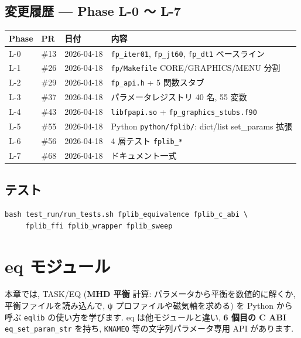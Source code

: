 \documentclass[11pt,a4paper]{report}
\begin{document}
\section{変更履歴 — Phase L-0 〜 L-7}

\begin{center}
\begin{tabular}{@{}lllp{6.5cm}@{}}
\toprule
Phase & PR  & 日付        & 内容 \\ \midrule
L-0   & \#13 & 2026-04-18 & \texttt{fp\_iter01}, \texttt{fp\_jt60}, \texttt{fp\_dt1} ベースライン \\
L-1   & \#26 & 2026-04-18 & \texttt{fp/Makefile} CORE/GRAPHICS/MENU 分割 \\
L-2   & \#29 & 2026-04-18 & \texttt{fp\_api.h} + 5 関数スタブ \\
L-3   & \#37 & 2026-04-18 & パラメータレジストリ 40 名, 55 変数 \\
L-4   & \#43 & 2026-04-18 & \texttt{libfpapi.so} + \texttt{fp\_graphics\_stubs.f90} \\
L-5   & \#55 & 2026-04-18 & Python \texttt{python/fplib/}: dict/list set\_params 拡張 \\
L-6   & \#56 & 2026-04-18 & 4 層テスト \texttt{fplib\_*} \\
L-7   & \#68 & 2026-04-18 & ドキュメント一式 \\
\bottomrule
\end{tabular}
\end{center}

\section{テスト}

\begin{lstlisting}[style=bash]
bash test_run/run_tests.sh fplib_equivalence fplib_c_abi \
     fplib_ffi fplib_wrapper fplib_sweep
\end{lstlisting}

\clearpage
\chapter{eq モジュール}
\label{ch:eq}

\begin{learn}
本章では, TASK/EQ (\textbf{MHD 平衡} 計算: パラメータから平衡を数値的に解くか,
平衡ファイルを読み込んで, ψ プロファイルや磁気軸を求める) を Python から呼ぶ
\texttt{eqlib} の使い方を学びます. eq は他モジュールと違い,
\textbf{6 個目の C ABI} \texttt{eq\_set\_param\_str} を持ち,
\texttt{KNAMEQ} 等の文字列パラメータ専用 API があります.
\end{learn}
\end{document}
